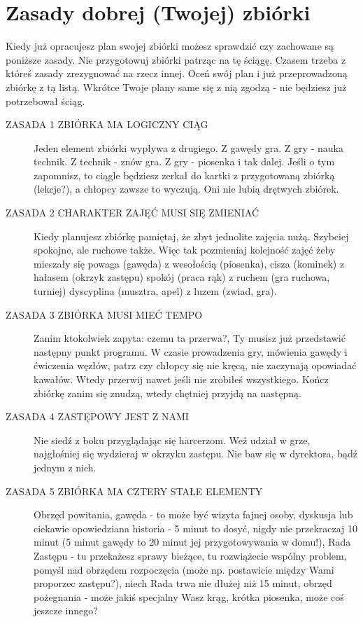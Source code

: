 \section{Zasady dobrej (Twojej) zbiórki}

Kiedy już opracujesz plan swojej zbiórki możesz sprawdzić czy zachowane są poniższe zasady. Nie przygotowuj zbiórki patrząc na tę ściągę. Czasem trzeba z któreś zasady zrezygnować na rzecz innej. Oceń swój plan i już  przeprowadzoną zbiórkę z tą listą. Wkrótce Twoje plany same się z nią zgodzą - nie będziesz już potrzebował ściąg.
\begin{description}


\item
[ZASADA 1 ZBIÓRKA MA LOGICZNY  CIĄG]
Jeden element zbiórki wypływa z drugiego. 
Z gawędy gra. 
Z gry - nauka  technik. 
Z technik - znów gra. 
Z gry - piosenka i tak dalej. 
Jeśli o tym zapomnisz, to ciągle będziesz zerkał do kartki z przygotowaną zbiórką (lekcje?),  a chłopcy zawsze to wyczują. 
Oni nie lubią drętwych zbiórek.
\item 
[ZASADA 2 CHARAKTER ZAJĘĆ MUSI  SIĘ ZMIENIAĆ]
Kiedy planujesz zbiórkę pamiętaj, że zbyt jednolite zajęcia nużą. 
Szybciej  spokojne, ale ruchowe także. 
Więc tak pozmieniaj kolejność zajęć  żeby mieszały się powaga (gawęda) z wesołością (piosenka), cisza (kominek) z hałasem (okrzyk  zastępu) spokój (praca rąk) z ruchem (gra ruchowa, turniej) dyscyplina (musztra, apel)  z luzem (zwiad,  gra).
\item
[ZASADA 3 ZBIÓRKA MUSI MIEĆ TEMPO]
Zanim ktokolwiek zapyta: czemu ta przerwa?, Ty musisz już przedstawić następny punkt programu. W czasie prowadzenia  gry,  mówienia gawędy i ćwiczenia węzłów, patrz czy  chłopcy się nie kręcą, nie zaczynają opowiadać kawałów. 
Wtedy  przerwij nawet jeśli nie zrobiłeś wszystkiego. 
Kończ  zbiórkę zanim się znudzą, wtedy chętniej przyjdą na następną.
\item
[ZASADA  4 ZASTĘPOWY JEST Z NAMI]
Nie siedź  z boku przyglądając się harcerzom. 
Weź udział w grze, najgłośniej się wydzieraj w okrzyku zastępu. 
Nie baw się w dyrektora, bądź jednym  z nich.
\item
[ZASADA  5 ZBIÓRKA  MA  CZTERY  STAŁE  ELEMENTY]
Obrzęd powitania, gawęda - to może być  wizyta fajnej osoby, dyskusja lub ciekawie opowiedziana historia - 5 minut to dosyć, nigdy nie przekraczaj 10 minut (5 minut gawędy to 20 minut jej przygotowywania w domu!), Rada Zastępu - tu  przekażesz sprawy bieżące,  tu  rozwiążecie wspólny problem, pomyśl nad obrzędem rozpoczęcia (może np. postawicie między Wami proporzec zastępu?), niech Rada trwa nie dłużej niż 15 minut, obrzęd pożegnania -  może jakiś specjalny Wasz krąg, krótka piosenka, może coś jeszcze innego?

\end{description}
